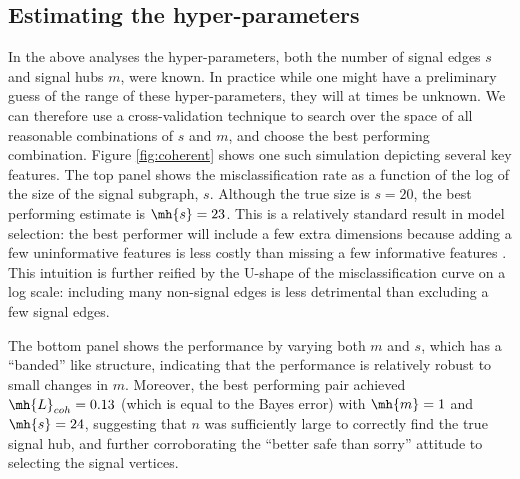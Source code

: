 \documentclass[10pt,journal,cspaper,compsoc]{IEEEtran}
\begin{document}
\subsection{Estimating the hyper-parameters} %
\label{sub:estimating_the_hyper_parameters}

In the above analyses the hyper-parameters, both the number of signal edges $s$ and signal hubs $m$, were known.  In practice while one might have a preliminary guess of the range of these hyper-parameters, they will at times be unknown.  We can therefore use a cross-validation technique to search over the space of all reasonable combinations of $s$ and $m$, and choose the best performing combination.  Figure \ref{fig:coherent} shows one such simulation depicting several key features.  The top panel shows the misclassification rate as a function of the log of the size of the signal subgraph, $s$.  Although the true size is $s=20$, the best performing estimate is $\mh{s}=23$. This is a relatively standard result in model selection: the best performer will include a few extra dimensions because adding a few uninformative features is less costly than missing a few informative features \cite{Jain2000}.  This intuition is further reified by the U-shape of the misclassification curve on a log scale: including many non-signal edges is less detrimental than excluding a few signal edges.

The bottom panel shows the performance by varying both $m$ and $s$, which has a ``banded'' like structure, indicating that the performance is relatively robust to small changes in $m$.  Moreover, the best performing pair achieved $\mh{L}_{coh}=0.13$ (which is equal to the Bayes error) with $\mh{m}=1$ and $\mh{s}=24$, suggesting that $n$ was sufficiently large to correctly find the true signal hub, and further corroborating the ``better safe than sorry'' attitude to selecting the signal vertices. 
\end{document}
